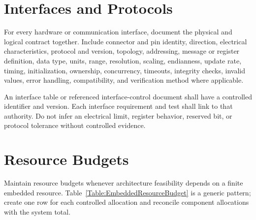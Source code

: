 \section{Interfaces and Protocols}
For every hardware or communication interface, document the physical and
logical contract together. Include connector and pin identity, direction,
electrical characteristics, protocol and version, topology, addressing,
message or register definition, data type, units, range, resolution, scaling,
endianness, update rate, timing, initialization, ownership, concurrency,
timeouts, integrity checks, invalid values, error handling, compatibility, and
verification method where applicable.

An interface table or referenced interface-control document shall have a
controlled identifier and version. Each interface requirement and test shall
link to that authority. Do not infer an electrical limit, register behavior,
reserved bit, or protocol tolerance without controlled evidence.

\section{Resource Budgets}
Maintain resource budgets whenever architecture feasibility depends on a
finite embedded resource. Table~\ref{Table:EmbeddedResourceBudget} is a generic
pattern; create one row for each controlled allocation and reconcile component
allocations with the system total.

